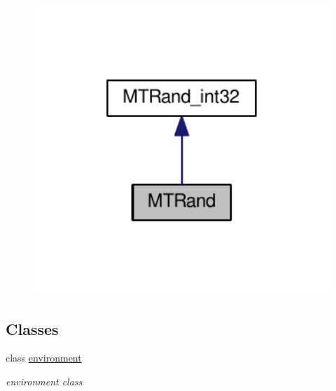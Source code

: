 \begin{figure}[H]
\begin{center}
\leavevmode
\includegraphics[width=350pt]{a00179}
\end{center}
\end{figure}
\subsection*{Classes}
\begin{DoxyCompactItemize}
\item 
class \hyperlink{a00014}{environment}
\begin{DoxyCompactList}\small\item\em environment class \end{DoxyCompactList}\end{DoxyCompactItemize}
